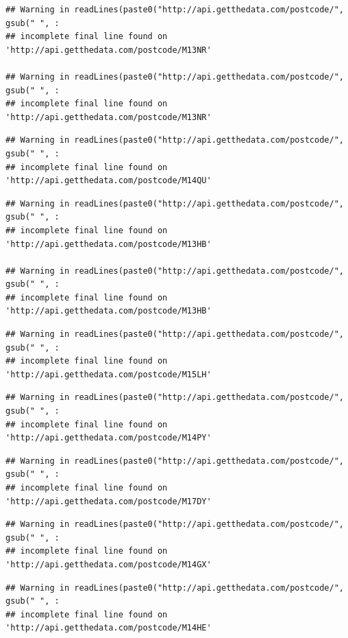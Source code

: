 \documentclass[]{book}
\begin{document}
\begin{verbatim}
## Warning in readLines(paste0("http://api.getthedata.com/postcode/", gsub(" ", :
## incomplete final line found on 'http://api.getthedata.com/postcode/M13NR'

## Warning in readLines(paste0("http://api.getthedata.com/postcode/", gsub(" ", :
## incomplete final line found on 'http://api.getthedata.com/postcode/M13NR'
\end{verbatim}

\begin{verbatim}
## Warning in readLines(paste0("http://api.getthedata.com/postcode/", gsub(" ", :
## incomplete final line found on 'http://api.getthedata.com/postcode/M14QU'
\end{verbatim}

\begin{verbatim}
## Warning in readLines(paste0("http://api.getthedata.com/postcode/", gsub(" ", :
## incomplete final line found on 'http://api.getthedata.com/postcode/M13HB'

## Warning in readLines(paste0("http://api.getthedata.com/postcode/", gsub(" ", :
## incomplete final line found on 'http://api.getthedata.com/postcode/M13HB'
\end{verbatim}

\begin{verbatim}
## Warning in readLines(paste0("http://api.getthedata.com/postcode/", gsub(" ", :
## incomplete final line found on 'http://api.getthedata.com/postcode/M15LH'
\end{verbatim}

\begin{verbatim}
## Warning in readLines(paste0("http://api.getthedata.com/postcode/", gsub(" ", :
## incomplete final line found on 'http://api.getthedata.com/postcode/M14PY'
\end{verbatim}

\begin{verbatim}
## Warning in readLines(paste0("http://api.getthedata.com/postcode/", gsub(" ", :
## incomplete final line found on 'http://api.getthedata.com/postcode/M17DY'
\end{verbatim}

\begin{verbatim}
## Warning in readLines(paste0("http://api.getthedata.com/postcode/", gsub(" ", :
## incomplete final line found on 'http://api.getthedata.com/postcode/M14GX'
\end{verbatim}

\begin{verbatim}
## Warning in readLines(paste0("http://api.getthedata.com/postcode/", gsub(" ", :
## incomplete final line found on 'http://api.getthedata.com/postcode/M14HE'
\end{verbatim}
\end{document}
